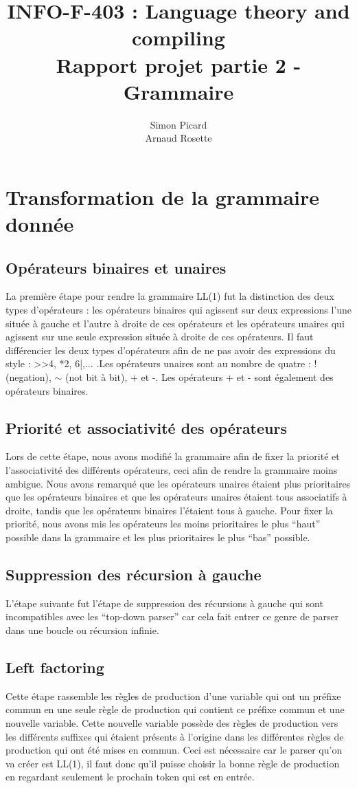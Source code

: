 \documentclass[a4paper,10pt]{article}
\title{INFO-F-403 : Language theory and compiling \\ Rapport projet partie 2 - Grammaire}
\author{Simon Picard \\ Arnaud Rosette}
\begin{document}
\maketitle

\section{Transformation de la grammaire donnée}
\subsection{Opérateurs binaires et unaires}
La première étape pour rendre la grammaire LL(1) fut la distinction des deux types d'opérateurs : les opérateurs binaires qui agissent sur deux expressions l'une située à gauche et l'autre à droite de ces opérateurs et les opérateurs unaires qui agissent sur une seule expression située à droite de ces opérateurs. Il faut différencier les deux types d'opérateurs afin de ne pas avoir des expressions du style : >>4, *2, 6|,... .Les opérateurs unaires sont au nombre de quatre : ! (negation), $\sim$ (not bit à bit), + et -. Les opérateurs + et - sont également des opérateurs binaires. 
\subsection{Priorité et associativité des opérateurs}
Lors de cette étape, nous avons modifié la grammaire afin de fixer la priorité et l'associativité des différents opérateurs, ceci afin de rendre la grammaire moins ambigue. Nous avons remarqué que les opérateurs unaires étaient plus prioritaires que les opérateurs binaires et que les opérateurs unaires étaient tous associatifs à droite, tandis que les opérateurs binaires l'étaient tous à gauche. Pour fixer la priorité, nous avons mis les opérateurs les moins prioritaires le plus ``haut'' possible dans la grammaire et les plus prioritaires le plus ``bas'' possible. 
\subsection{Suppression des récursion à gauche}
L'étape suivante fut l'étape de suppression des récursions à gauche qui sont incompatibles avec les ``top-down parser'' car cela fait entrer ce genre de parser dans une boucle ou récursion infinie.
\subsection{Left factoring}
Cette étape rassemble les règles de production d'une variable qui ont un préfixe commun en une seule règle de production qui contient ce préfixe commun et une nouvelle variable. Cette nouvelle variable possède des règles de production vers les différents suffixes qui étaient présents à l'origine dans les différentes règles de production qui ont été mises en commun. Ceci est nécessaire car le parser qu'on va créer est LL(1), il faut donc qu'il puisse choisir la bonne règle de production en regardant seulement le prochain token qui est en entrée.
\end{document}
